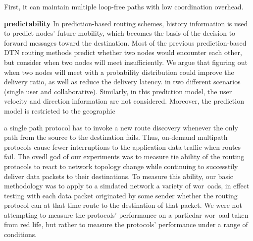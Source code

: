 \documentclass[letterpaper, 10 pt, conference]{ieeeconf}  %
\begin{document}
First, it can maintain multiple loop-free paths with low coordination overhead.

\textbf{predictability}
In prediction-based routing schemes, history information is used to predict nodes’ future mobility, which becomes the basis of the decision to forward messages toward the destination. Most of the previous prediction-based DTN
routing methods predict whether two nodes would encounter each other, but consider when two nodes will meet insufficiently. We argue that figuring out when two nodes will meet with a probability distribution could improve the
delivery ratio, as well as reduce the delivery latency. in two different scenarios (single user and collaborative). Similarly, in this prediction model, the user velocity and direction information are not considered. Moreover, the prediction model is restricted to the geographic





\cite{Navidi2003Stationary}

\cite{BrochAProtocols}











 a single path
protocol has to invoke a new route discovery whenever
the only path from the source to the destination fails.
Thus, on-demand multipath protocols cause fewer
interruptions to the application data traffic when routes
fail. The ovedl god of our experiments was to measure tie ability of
the routing protocols to react to network topology change while
continuing to successtily deliver data packets to their destinations.
To measure this ability, our basic methodology was to apply to a
simdated network a variety of wor~oads, in effect testing with each
data packet originated by some sender whether the routing protocol
can at that time route to the destination of that packet. We were
not attempting to measure the protocols’ performance on a particdar
wor~oad taken from red life, but rather to measure the protocols’
performance under a range of conditions.

\end{document}

